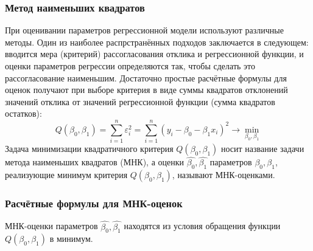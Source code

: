 \documentclass[12pt]{article}
\begin{document}
	\subsubsection{Метод наименьших квадратов}
	 При оценивании параметров регрессионной модели используют различные методы. Один из наиболее распрстранённых подходов заключается в следующем: вводится мера (критерий) рассогласования отклика и регрессионной функции, и оценки параметров регрессии определяются так, чтобы сделать это рассогласование наименьшим. Достаточно простые расчётные формулы для оценок получают при выборе критерия в виде суммы квадратов отклонений значений отклика от значений регрессионной функции (сумма квадратов остатков):
	\begin{equation}
		Q(\beta_{0}, \beta_{1}) = \sum_{i=1}^{n}{\varepsilon_{i}^{2}} = 
		\sum_{i=1}^{n}{(y_{i} - \beta_{0} - \beta_{1}x_{i})^{2}}\rightarrow \min_{\beta_{0}, \beta_{1}}
		\label{Q_beta}
	\end{equation}
	Задача минимизации квадратичного критерия $Q(\beta_0, \beta_1)$ носит название задачи метода наименьших квадратов (МНК), а оценки $\hat{\beta_0}, \hat{\beta_1}$ параметров $\beta_0, \beta_1$, реализующие минимум критерия $Q(\beta_0, \beta_1)$, называют МНК-оценками. 
	
	\subsubsection{Расчётные формулы для МНК-оценок}
	 МНК-оценки параметров $\hat{\beta_0}, \hat{\beta_1}$ находятся из условия обращения функции $Q(\beta_0, \beta_1)$ в минимум. 
\end{document}

